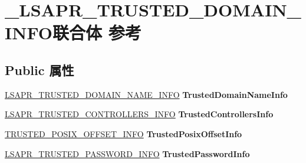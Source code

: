 \hypertarget{union___l_s_a_p_r___t_r_u_s_t_e_d___d_o_m_a_i_n___i_n_f_o}{}\section{\+\_\+\+L\+S\+A\+P\+R\+\_\+\+T\+R\+U\+S\+T\+E\+D\+\_\+\+D\+O\+M\+A\+I\+N\+\_\+\+I\+N\+F\+O联合体 参考}
\label{union___l_s_a_p_r___t_r_u_s_t_e_d___d_o_m_a_i_n___i_n_f_o}
\subsection*{Public 属性}
\begin{DoxyCompactItemize}
\item 
\mbox{\label{union___l_s_a_p_r___t_r_u_s_t_e_d___d_o_m_a_i_n___i_n_f_o_ad38f737c2848d76bbac0c66617556661}} 
\hyperlink{struct___l_s_a_p_r___t_r_u_s_t_e_d___d_o_m_a_i_n___n_a_m_e___i_n_f_o}{L\+S\+A\+P\+R\+\_\+\+T\+R\+U\+S\+T\+E\+D\+\_\+\+D\+O\+M\+A\+I\+N\+\_\+\+N\+A\+M\+E\+\_\+\+I\+N\+FO} {\bfseries Trusted\+Domain\+Name\+Info}
\item 
\mbox{\label{union___l_s_a_p_r___t_r_u_s_t_e_d___d_o_m_a_i_n___i_n_f_o_a463be41ea0916be12c27867cd26d949a}} 
\hyperlink{struct___l_s_a_p_r___t_r_u_s_t_e_d___c_o_n_t_r_o_l_l_e_r_s___i_n_f_o}{L\+S\+A\+P\+R\+\_\+\+T\+R\+U\+S\+T\+E\+D\+\_\+\+C\+O\+N\+T\+R\+O\+L\+L\+E\+R\+S\+\_\+\+I\+N\+FO} {\bfseries Trusted\+Controllers\+Info}
\item 
\mbox{\label{union___l_s_a_p_r___t_r_u_s_t_e_d___d_o_m_a_i_n___i_n_f_o_a5f92b37837aa01a4190cd55b56120595}} 
\hyperlink{struct___t_r_u_s_t_e_d___p_o_s_i_x___o_f_f_s_e_t___i_n_f_o}{T\+R\+U\+S\+T\+E\+D\+\_\+\+P\+O\+S\+I\+X\+\_\+\+O\+F\+F\+S\+E\+T\+\_\+\+I\+N\+FO} {\bfseries Trusted\+Posix\+Offset\+Info}
\item 
\mbox{\label{union___l_s_a_p_r___t_r_u_s_t_e_d___d_o_m_a_i_n___i_n_f_o_add0fa561f91fb35992c009433dc70e6f}} 
\hyperlink{struct___l_s_a_p_r___t_r_u_s_t_e_d___p_a_s_s_w_o_r_d___i_n_f_o}{L\+S\+A\+P\+R\+\_\+\+T\+R\+U\+S\+T\+E\+D\+\_\+\+P\+A\+S\+S\+W\+O\+R\+D\+\_\+\+I\+N\+FO} {\bfseries Trusted\+Password\+Info}

\end{DoxyCompactItemize}
